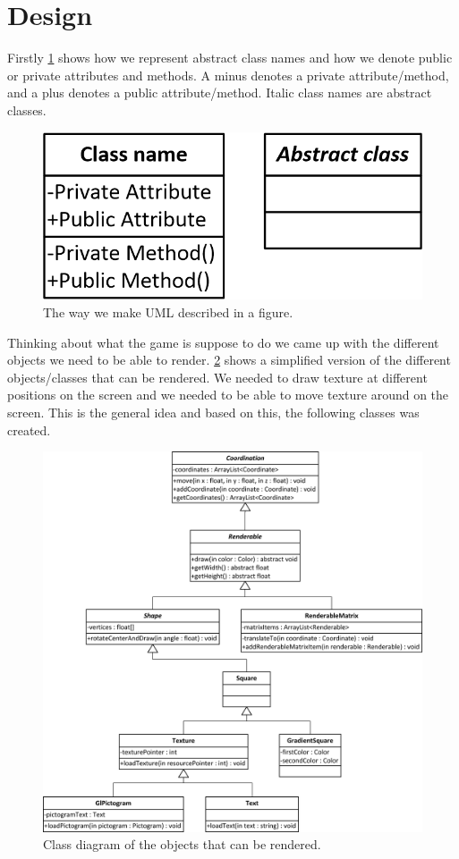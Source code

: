 \section{Design}
Firstly \ref{fig:terminology} shows how we represent abstract class names and how we denote public or private attributes and methods. A minus denotes a private attribute/method, and a plus denotes a public attribute/method. Italic class names are abstract classes. 
\begin{figure}[H]
\centering
\includegraphics[width=0.4\linewidth]{img/terminology.png}
\caption{The way we make UML described in a figure.}
\label{fig:terminology}
\end{figure}
Thinking about what the game is suppose to do we came up with the different objects we need to be able to render. \ref{fig:renderables} shows a simplified version of the different objects/classes that can be rendered. We needed to draw texture at different positions on the screen and we needed to be able to move texture around on the screen. This is the general idea and based on this, the following classes was created.

\begin{figure}[H]
\centering
\includegraphics[width=0.9\linewidth]{img/renderables.png}%
\caption{Class diagram of the objects that can be rendered.}
\label{fig:renderables}
\end{figure}

